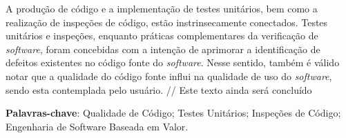 \begin{resumo}
 
 A produção de código e a implementação de testes unitários, bem como a realização de inspeções de código, estão instrinsecamente conectados. Testes unitários e inspeções, enquanto práticas complementares da verificação de \textit{software}, foram concebidas com a intenção de aprimorar a identificação de defeitos existentes no código fonte do \textit{software}. Nesse sentido, também é válido notar que a qualidade do código fonte influi na qualidade de uso do \textit{software}, sendo esta contemplada pelo usuário. // Este texto ainda será concluído

 \vspace{\onelineskip}
    
 \noindent
 \textbf{Palavras-chave}: Qualidade de Código; Testes Unitários; Inspeções de Código; Engenharia de Software Baseada em Valor.
\end{resumo}
